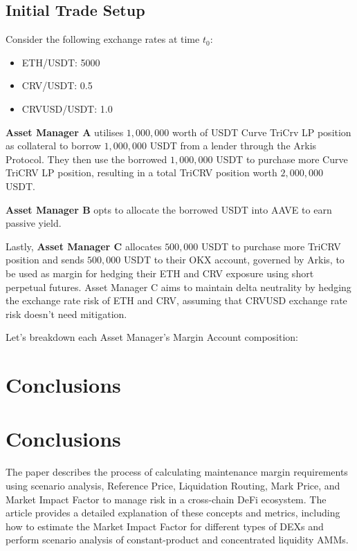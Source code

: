 \documentclass[conference]{IEEEtran}
\begin{document}
\subsection{Initial Trade Setup}
Consider the following exchange rates at time $t_{0}$:
\begin{itemize}
	\item ETH/USDT: 5000
	\item CRV/USDT: 0.5
	\item CRVUSD/USDT: 1.0
\end{itemize}

\textbf{Asset Manager A} utilises $1,000,000$ worth of USDT Curve TriCrv LP position as collateral to borrow $1,000,000$ USDT from a lender through the Arkis Protocol. They then use the borrowed $1,000,000$ USDT to purchase more Curve TriCRV LP position, resulting in a total TriCRV position worth $2,000,000$ USDT.

\textbf{Asset Manager B} opts to allocate the borrowed USDT into AAVE to earn passive yield. 

Lastly, \textbf{Asset Manager C} allocates $500,000$ USDT to purchase more TriCRV position and sends $500,000$ USDT to their OKX account, governed by Arkis, to be used as margin for hedging their ETH and CRV exposure using short perpetual futures. Asset Manager C aims to maintain delta neutrality by hedging the exchange rate risk of ETH and CRV, assuming that CRVUSD exchange rate risk doesn’t need mitigation.


Let's breakdown each Asset Manager's Margin Account composition:
 




\section{Conclusions}


\section{Conclusions}
The paper describes the process of calculating maintenance margin requirements using scenario analysis, Reference Price, Liquidation Routing, Mark Price, and Market Impact Factor to manage risk in a cross-chain DeFi ecosystem. The article provides a detailed explanation of these concepts and metrics, including how to estimate the Market Impact Factor for different types of DEXs and perform scenario analysis of constant-product and concentrated liquidity AMMs. 
\end{document}
